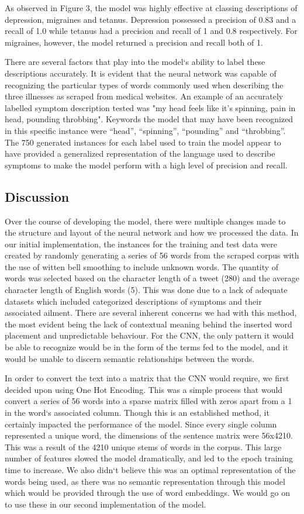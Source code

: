 \documentclass[12pt]{report}
\begin{document}
As observed in Figure 3, the model was highly effective at classing descriptions of
depression, migraines and tetanus. Depression possessed a precision of 0.83 and a
recall of 1.0 while tetanus had a precision and recall of 1 and 0.8 respectively.
For migraines, however, the model returned a precision and recall both of 1.

There are several factors that play into the model`s ability to label these descriptions
accurately. It is evident that the neural network was capable of recognizing the particular
types of words commonly used when describing the three illnesses as scraped from medical
websites. An example of an accurately labelled symptom description tested was "my head
feels like it's spinning, pain in head, pounding throbbing". Keywords the model that
may have been recognized in this specific instance were “head”, “spinning”, “pounding” and
“throbbing”. The 750 generated instances for each label used to train the model appear to
have provided a generalized representation of the language used to describe symptoms to make
the model perform with a high level of precision and recall.

\subsection{Discussion}
Over the course of developing the model, there were multiple changes made to the
structure and layout of the neural network and how we processed the data. In our
initial implementation, the instances for the training and test data were created
by randomly generating a series of 56 words from the scraped corpus with the use
of witten bell smoothing to include unknown words. The quantity of words was selected
based on the character length of a tweet (280) and the average character length of
English words (5). This was done due to a lack of adequate datasets which included
categorized descriptions of symptoms and their associated ailment. There are several
inherent concerns we had with this method, the most evident being the lack of contextual
meaning behind the inserted word placement and unpredictable behaviour. For the CNN, the
only pattern it would be able to recognize would be in the form of the terms fed to the
model, and it would be unable to discern semantic relationships between the words.

In order to convert the text into a matrix that the CNN would require, we first decided
upon using One Hot Encoding. This was a simple process that would convert a series of 56
words into a sparse matrix filled with zeros apart from a 1 in the word`s associated column.
Though this is an established method, it certainly impacted the performance of the model.
Since every single column represented a unique word, the dimensions of the sentence matrix
were 56x4210. This was a result of the 4210 unique stems of words in the corpus. This large
number of features slowed the model dramatically, and led to the epoch training time to increase.
We also didn`t believe this was an optimal representation of the words being used, as there was
no semantic representation through this model which would be provided through the use of word
embeddings. We would go on to use these in our second implementation of the model.
\end{document}
